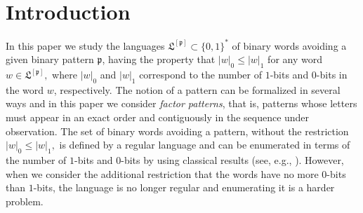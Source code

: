 

\section{Introduction}
\label{sec:introduction}


In this paper we study the languages  $\mathfrak{L}^{[\mathfrak{p}]}\subset
\{0,1\}^*$ of binary words avoiding a given binary pattern $\mathfrak{p}$,
having the property that $|w|_0\leq |w|_1$ for any word $w\in
\mathfrak{L}^{[\mathfrak{p}]},$ where  $|w|_0$ and $|w|_1$ correspond to the
number of $1$-bits  and $0$-bits in the word $w$, respectively.  The notion of a
pattern can be formalized in several ways and in this paper we consider
\textit{factor patterns}, that is, patterns whose  letters must appear in an
exact order and contiguously in the sequence under observation.  The set of
binary words avoiding a pattern, without the restriction $|w|_0\leq |w|_1,$ is
defined by a regular language and can be enumerated in terms of the number of
$1$-bits  and $0$-bits  by using classical results  (see, e.g.,
\cite{GO80,GO81,SF96}).  However, when we consider the additional restriction
that the words have no more $0$-bits  than $1$-bits, the language is no longer
regular and enumerating it is a harder problem.

